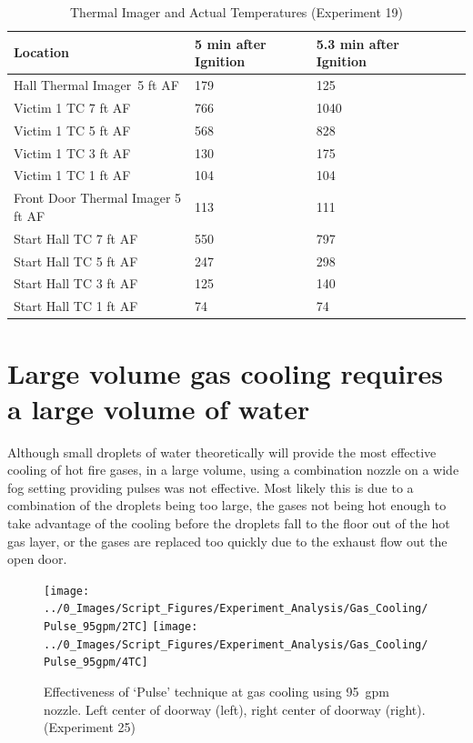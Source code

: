 \documentclass[12pt,oneside]{book}
\begin{document}
\begin{table}[H]
\centering
\begin{tabular}{|L{0.25\textwidth}|C{0.15\textwidth}|C{0.15\textwidth}|C{0.15\textwidth}|C{0.15\textwidth}|}
\hline
Location	                    &5 min after Ignition	&5.3 min after Ignition \\ \hline \hline
Hall Thermal Imager~5 ft AF 	&179	&125	\\ \hline
Victim 1 TC 7 ft AF				&766	&1040	\\ \hline
Victim 1 TC 5 ft AF				&568	&828	\\ \hline
Victim 1 TC 3 ft AF				&130	&175	\\ \hline
Victim 1 TC 1 ft AF				&104	&104	\\ \hline
Front Door Thermal Imager 5 ft AF &113	&111	\\ \hline
Start Hall TC 7 ft AF			&550	&797	\\ \hline
Start Hall TC 5 ft AF			&247	&298	\\ \hline
Start Hall TC 3 ft AF			&125	&140	\\ \hline
Start Hall TC 1 ft AF			&74		&74		\\ \hline
\end{tabular}
\caption{Thermal Imager and Actual Temperatures (Experiment 19)}
\label{table:hall_thermal_imager_19}
\end{table}

\section{Large volume gas cooling requires a large volume of water} \label{tc:large_volume_gas_cooling}
Although small droplets of water theoretically will provide the most effective cooling of hot fire gases, in a large volume, using a combination nozzle on a wide fog setting providing pulses was not effective. Most likely this is due to a combination of the droplets being too large, the gases not being hot enough to take advantage of the cooling before the droplets fall to the floor out of the hot gas layer, or the gases are replaced too quickly due to the exhaust flow out the open door.

\begin{figure}[H]
\centering
\texttt{[image: ../0\_Images/Script\_Figures/Experiment\_Analysis/Gas\_Cooling/Pulse\_95gpm/2TC]}
\texttt{[image: ../0\_Images/Script\_Figures/Experiment\_Analysis/Gas\_Cooling/Pulse\_95gpm/4TC]}
\caption[Gas Cooling Example - Pulse 95~gpm Setting]{Effectiveness of `Pulse' technique at gas cooling using 95~gpm nozzle. Left center of doorway (left), right center of doorway (right). (Experiment 25)}
\label{fig:gas_pulse_95_TC}
\end{figure}
\end{document}
